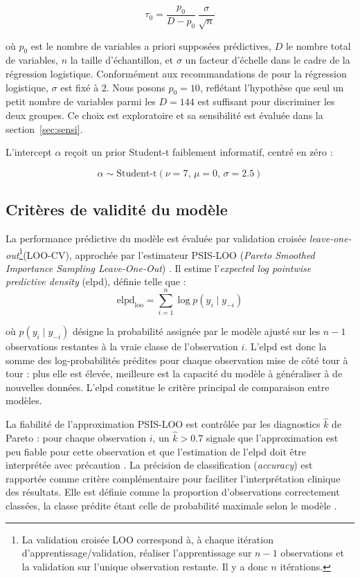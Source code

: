\[
\tau_0 = \frac{p_0}{D - p_0}\,\frac{\sigma}{\sqrt{n}}
\]

où $p_0$ est le nombre de variables a priori supposées prédictives, $D$ le nombre total de variables, $n$ la taille d'échantillon, et $\sigma$ un facteur d'échelle dans le cadre de la régression logistique. Conformément aux recommandations de \textcite{Piironen2017Jul} pour la régression logistique, $\sigma$ est fixé à 2. Nous posons $p_0 = 10$, reflétant l'hypothèse que seul un petit nombre de variables parmi les $D = 144$ est suffisant pour discriminer les deux groupes. Ce choix est exploratoire et sa sensibilité est évaluée dans la section~\ref{sec:sensi}.

L'intercept $\alpha$ reçoit un prior Student-t faiblement informatif, centré en zéro :

\[
\alpha \sim \mathrm{Student\text{-}t}(\nu=7,\, \mu=0,\, \sigma=2.5)
\]



\subsection{Critères de validité du modèle}\label{sec:validite}

La performance prédictive du modèle est évaluée par validation croisée \textit{leave-one-out}\footnote{La validation croisée LOO correspond à, à chaque itération d'apprentissage/validation, réaliser l'apprentissage sur $n - 1$ observations et la validation sur l'unique observation restante. Il y a donc $n$ itérations.}\break (LOO-CV), approchée par l'estimateur PSIS-LOO (\textit{Pareto Smoothed Importance Sampling Leave-One-Out}) \parencite{Vehtari2015Jul}. Il estime l'\textit{expected log pointwise predictive density} (elpd), définie telle que :
\[
\text{elpd}_{\text{loo}} = \sum_{i=1}^{n} 
\log p(y_i \mid y_{-i})
\]

où $p(y_i \mid y_{-i})$ désigne la probabilité assignée par le modèle ajusté sur les $n-1$ observations restantes à la vraie classe de l'observation $i$. L'elpd est donc la somme des log-probabilités prédites pour chaque observation mise de côté tour à tour : plus elle est élevée, meilleure est la capacité du modèle à généraliser à de nouvelles données. L'elpd constitue le critère principal de comparaison entre modèles.

\medskip 

La fiabilité de l'approximation PSIS-LOO est contrôlée par les diagnostics $\hat{k}$ de Pareto : pour chaque observation $i$, un $\hat{k} > 0.7$ signale que l'approximation est peu fiable pour cette observation et que l'estimation de l'elpd doit être interprétée avec précaution \parencite{Vehtari2015Jul}. La précision de classification (\textit{accuracy}) %
est rapportée comme critère complémentaire pour faciliter l'interprétation clinique des résultats. Elle est définie comme la proportion d'observations correctement classées, la classe prédite étant celle de probabilité maximale selon le modèle \parencite{projpred}.


